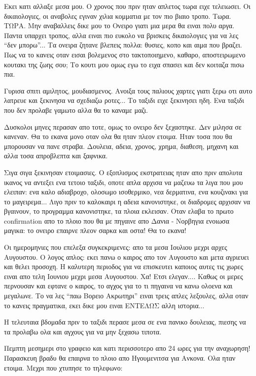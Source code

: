 \documentclass[11pt, letterpaper]{book}
\begin{document}
Εκει κατι αλλαξε μεσα μου. Ο χρονος που πριν ηταν απλετος τωρα ειχε τελειωσει. Οι δικαιολογιες, οι αναβολες εγιναν χιλια κομματια με τον πιο βιαιο τροπο. Τωρα. ΤΩΡΑ.
Μην αναβαλλεις δικε μου το Ονειρο γιατι μια μερα θα ειναι πολυ αργα. Παντα υπαρχει τροπος, αλλα ειναι πιο ευκολο να βρισκεις δικαιολογιες για να λες ``δεν μπορω''... Τα ονειρα ζητανε βλεπεις πολλα: θυσιες, κοπο και αιμα που βραζει. Πως να το κανεις οταν εισαι βολεμενος στο τακτοποιημενο, καθαρο, αποστειρωμενο κουτακι της ζωης σου; Το κουτι μου ομως εγω το ειχα σπασει και δεν κοιταζα πισω πια.

Γυρισα σπιτι αμιλητος, μουδιασμενος. Ανοιξα τους παλιους χαρτες γιατι ξερω οτι αυτο λατρευε και ξεκινησα να σχεδιαζω ροτες... Το ταξιδι ειχε ξεκινησει ηδη. Ενα ταξιδι που δεν προλαβε γαμωτο αλλα θα το καναμε μαζι.

Δυσκολοι μηνες περασαν απο τοτε, ομως το ονειρο δεν ξεχαστηκε. Δεν μιλησα σε κανεναν. Θα το εκανα μονο οταν ολα θα ηταν πλεον ετοιμα. Ηταν τοσα που θα μπορουσαν να πανε στραβα. Δουλεια, αδεια, χρονος, χρημα, διαθεση, μηχανη και αλλα τοσα απροβλεπτα και ξαφνικα.

Σιγα σιγα ξεκινησαν ετοιμασιες. Ο εξοπλισμος εκστρατειας ηταν απο πριν απολυτα ικανος να αντεξει ενα τετοιο ταξιδι, οποτε απλα αρχισα να μαζευω τα λιγα που μου ελειπαν: ενα καλο αδιαβροχο, ολοσωμο ισοθερμικο, νεα δερματινα, ενα κουζινακι για το μαγειρεμα... Λιγο πριν το καλοκαιρι η αδεια κανονιστηκε, οι διαδρομες αρχισαν να βγαινουν, το προγραμμα κανονιστηκε, τα πλοια εκλεισαν. Οταν ελαβα το πρωτο confirmation απο το πλοιο που θα με πηγαινε απο Δανια - Νορβηγια ενοιωσα μαγικα: το ονειρο επαιρνε πλεον σαρκα και οστα! Θα το εκανα!

Οι ημερομηνιες που επελεξα συγκεκριμενες: απο τα μεσα Ιουλιου μεχρι αρχες Αυγουστου. Ο λογος απλος: εκει πανω ο καιρος απο τον Αυγουστο και μετα αγριευει και θελει προσοχη. Η καλυτερη περιοδος για να επισκευτει καποιος αυτες τις χωρες ειναι απο τελη Ιουνιου μεχρι μεσα Αυγουστου. Χα! Ετσι ελεγαν.... Καθως οι μερες περνουσαν και εφτανε ο καιρος, το αγχος για το τι πηγαινα να κανω ολοενα και μεγαλωνε. Το να λες ``παω Βορειο Ακρωτηρι'' ειναι τρεις απλες λεξουλες, αλλα οταν το κανεις πραγματικα, εκει δικε μου ειναι ΕΝΤΕΛΩΣ αλλη ιστορια...

Η τελευταια βδομαδα πριν το ταξιδι περασε μεσα σε ενα πανικο δουλειας, πιεσης να τα προλαβω ολα και αγχους για να μην ξεχασω τιποτα.

Πεμπτη μεσημερι στο γραφειο και κατι περισσοτερο απο 24 ωρες για την αναχωρηση! Παρασκευη βραδυ θα επαιρνα το πλοιο απο Ηγουμενιτσα για Ανκονα. Ολα ηταν ετοιμα. Μεχρι που χτυπησε το τηλεφωνο:
\end{document}
